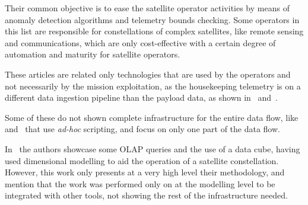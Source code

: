 Their common objective is to ease the satellite operator activities by means of anomaly detection algorithms and telemetry bounds checking.
Some operators in this list are responsible for constellations of complex satellites, like remote sensing and communications, which are only cost-effective with a certain degree of automation and maturity for satellite operators.

These articles are related only technologies that are used by the operators and not necessarily by the mission exploitation, as the housekeeping telemetry is on a different data ingestion pipeline than the payload data, as shown in~ and~.

Some of these do not shown complete infrastructure for the entire data flow, like~ and~ that use \textit{ad-hoc} scripting, and focus on only one part of the data flow.

In~ the authors showcase some OLAP queries and the use of a data cube, having used dimensional modelling to aid the operation of a satellite constellation.
However, this work only presents at a very high level their methodology, and mention that the work was performed only on at the modelling level to be integrated with other tools, not showing the rest of the infrastructure needed.

